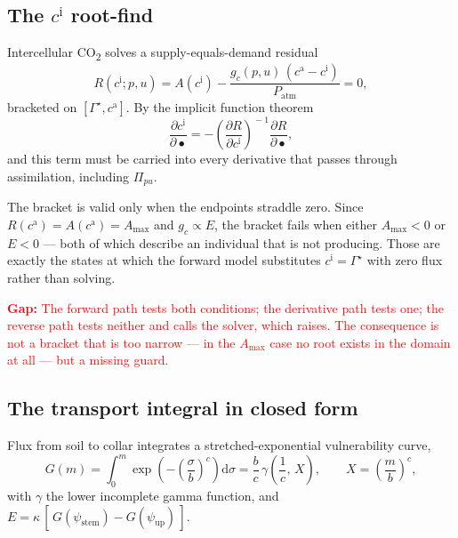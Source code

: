 \documentclass[11pt,a4paper]{article}
\newcommand{\dd}[2]{\frac{\partial #1}{\partial #2}}
\newcommand{\gap}[1]{\textcolor{red}{\textbf{Gap:} #1}}
\begin{document}
\subsection{The $c^{\mathrm{i}}$ root-find}
\label{sec:ci}

Intercellular CO\textsubscript{2} solves a supply-equals-demand residual
\begin{equation}
R(c^{\mathrm{i}}; p, u) = A(c^{\mathrm{i}})
  - \frac{g_c(p,u)\,(c^{\mathrm{a}} - c^{\mathrm{i}})}{P_{\mathrm{atm}}} = 0,
\label{eq:ci}
\end{equation}
bracketed on $[\Gamma^\star, c^{\mathrm{a}}]$. By the implicit function theorem
\begin{equation}
\dd{c^{\mathrm{i}}}{\bullet} = -\left(\dd{R}{c^{\mathrm{i}}}\right)^{\!-1}
\dd{R}{\bullet},
\label{eq:ciadj}
\end{equation}
and this term must be carried into every derivative that passes through
assimilation, including $\Pi_{pu}$.

The bracket is valid only when the endpoints straddle zero. Since
$R(c^{\mathrm{a}}) = A(c^{\mathrm{a}}) = A_{\max}$ and $g_c \propto E$, the
bracket fails when either $A_{\max} < 0$ or $E < 0$ --- both of which describe an
individual that is not producing. Those are exactly the states at which the
forward model substitutes $c^{\mathrm{i}} = \Gamma^\star$ with zero flux rather
than solving.

\gap{The forward path tests both conditions; the derivative path tests one; the
reverse path tests neither and calls the solver, which raises. The consequence is
not a bracket that is too narrow --- in the $A_{\max}$ case no root exists in the
domain at all --- but a missing guard.}

\subsection{The transport integral in closed form}
\label{sec:transport}

Flux from soil to collar integrates a stretched-exponential vulnerability curve,
\begin{equation}
G(m) = \int_0^m \exp\!\left(-\left(\frac{\sigma}{b}\right)^{c}\right)
\mathrm{d}\sigma
= \frac{b}{c}\, \gamma\!\left(\frac{1}{c},\, X\right),
\qquad
X = \left(\frac{m}{b}\right)^{c},
\label{eq:G}
\end{equation}
with $\gamma$ the lower incomplete gamma function, and $E = \kappa\,[\,G(\psi_{\mathrm{stem}}) - G(\psi_{\mathrm{up}})\,]$.
\end{document}
